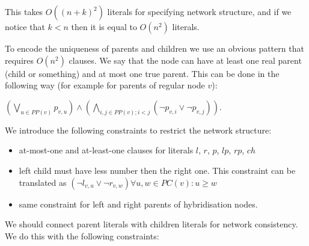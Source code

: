 \documentclass[runningheads, envcountsame, a4paper]{llncs}
\begin{document}
This takes $O((n + k)^2)$ literals for specifying network structure, and if we notice that $k < n$ then it is equal to $O(n^2)$ literals.

To encode the uniqueness of parents and children we use an obvious pattern that requires $O(n^2)$ clauses. We say that the node can have at least one real parent (child or something) and at most one true parent. This can be done in the following way (for example for parents of regular node $v$):

$(\bigvee\limits_{u \in PP(v)} p_{v,u}) \wedge (\bigwedge\limits_{i, j \in PP(v);i < j} (\neg p_{v,i} \vee \neg p_{v,j}))$.

We introduce the following constraints to restrict the network structure:

\begin{itemize}

\item at-most-one and at-least-one clauses for literals $l$, $r$, $p$, $lp$, $rp$, $ch$

\item left child must have less number then the right one. This constraint can be translated as 
      $(\neg l_{v,u} \vee \neg r_{v,w}) \forall u, w \in PC(v): u \geq w$
      
\item same constraint for left and right parents of hybridisation nodes.

\end{itemize}

We should connect parent literals with children literals for network consistency. We do this with the following constraints:
\end{document}
